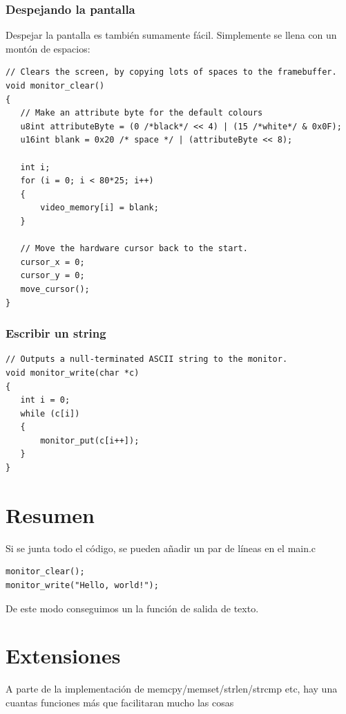 \documentclass{report}
\begin{document}
\subsubsection{Despejando la pantalla}

Despejar la pantalla es tambi\'{e}n sumamente f\'{a}cil. Simplemente se llena con un mont\'{o}n de espacios:

\begin{lstlisting}
// Clears the screen, by copying lots of spaces to the framebuffer.
void monitor_clear()
{
   // Make an attribute byte for the default colours
   u8int attributeByte = (0 /*black*/ << 4) | (15 /*white*/ & 0x0F);
   u16int blank = 0x20 /* space */ | (attributeByte << 8);

   int i;
   for (i = 0; i < 80*25; i++)
   {
       video_memory[i] = blank;
   }

   // Move the hardware cursor back to the start.
   cursor_x = 0;
   cursor_y = 0;
   move_cursor();
}
\end{lstlisting}

\subsubsection{Escribir un string}

\begin{lstlisting}
// Outputs a null-terminated ASCII string to the monitor.
void monitor_write(char *c)
{
   int i = 0;
   while (c[i])
   {
       monitor_put(c[i++]);
   }
}
\end{lstlisting}

\section{Resumen}

Si se junta todo el c\'{o}digo, se pueden añadir un par de l\'{i}neas en el main.c

\begin{lstlisting}
monitor_clear();
monitor_write("Hello, world!");
\end{lstlisting}

De este modo conseguimos un la funci\'{o}n de salida de texto. 

\section{Extensiones}
A parte de la implementaci\'{o}n de memcpy/memset/strlen/strcmp etc, hay una cuantas funciones m\'{a}s que facilitaran mucho las cosas
\end{document}
